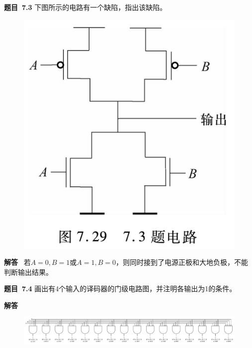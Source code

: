 \documentclass[10pt,a4paper,UTF8]{ctexart}
\newcommand{\problemname}{待定义}
\newenvironment{problem}{\begin{shaded}\par\noindent\textbf{题目\  \problemname}}{\end{shaded}\par}
\newenvironment{solution}{\par\noindent\textbf{解答}\ }{\par}
\begin{document}
\renewcommand{\problemname}{7.3}
\begin{problem}
	下图所示的电路有一个缺陷，指出该缺陷。
\end{problem}
\begin{figure}[H]
	\centering
	\includegraphics[scale=0.25]{img/7.3.png}
\end{figure}

\begin{solution}
	若$A=0,B=1$或$A=1,B=0$，则同时接到了电源正极和大地负极，不能判断输出结果。
\end{solution}


\renewcommand{\problemname}{7.4}
\begin{problem}
	画出有4个输入的译码器的门级电路图，并注明各输出为1的条件。
\end{problem}

\begin{solution}
	\begin{figure}[H]
		\centering
		\includegraphics[scale=0.4]{img/7.4.pdf}
	\end{figure}
\end{solution}
\end{document}
